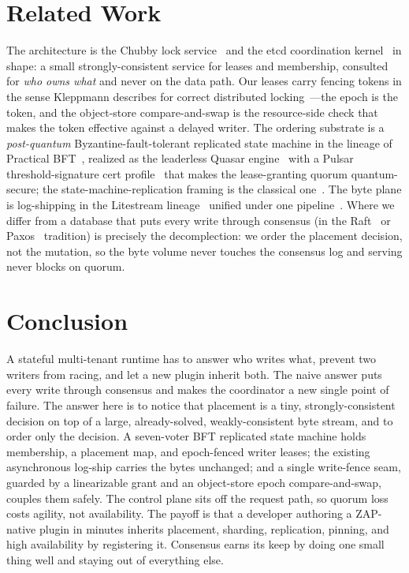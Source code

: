 \documentclass[11pt]{article}
\begin{document}
\section{Related Work}
\label{sec:related}

The architecture is the Chubby lock service~\cite{chubby} and the etcd
coordination kernel~\cite{etcdraft} in shape: a small strongly-consistent
service for leases and membership, consulted for \emph{who owns what} and
never on the data path. Our leases carry fencing tokens in the sense
Kleppmann describes for correct distributed locking~\cite{fencing}---the epoch
is the token, and the object-store compare-and-swap is the resource-side check
that makes the token effective against a delayed writer. The ordering
substrate is a \emph{post-quantum} Byzantine-fault-tolerant replicated
state machine in the lineage of Practical BFT~\cite{pbft}, realized as the
leaderless Quasar engine~\cite{avalanche,luxconsensus} with a Pulsar
threshold-signature cert profile~\cite{pulsar} that makes the lease-granting
quorum quantum-secure; the state-machine-replication framing is the classical
one~\cite{smr}. The byte
plane is log-shipping in the Litestream lineage~\cite{litestream} unified
under one pipeline~\cite{hip0107}. Where we differ from a database that puts
every write through consensus (in the Raft~\cite{raft} or Paxos~\cite{paxos}
tradition) is precisely the decomplection: we order the placement decision,
not the mutation, so the byte volume never touches the consensus log and
serving never blocks on quorum.

\section{Conclusion}
\label{sec:conclusion}

A stateful multi-tenant runtime has to answer who writes what, prevent two
writers from racing, and let a new plugin inherit both. The naive answer puts
every write through consensus and makes the coordinator a new single point of
failure. The answer here is to notice that placement is a tiny,
strongly-consistent decision on top of a large, already-solved,
weakly-consistent byte stream, and to order only the decision. A seven-voter
BFT replicated state machine holds membership, a placement map, and
epoch-fenced writer leases; the existing asynchronous log-ship carries the
bytes unchanged; and a single write-fence seam, guarded by a linearizable
grant and an object-store epoch compare-and-swap, couples them safely. The
control plane sits off the request path, so quorum loss costs agility, not
availability. The payoff is that a developer authoring a ZAP-native plugin in
minutes inherits placement, sharding, replication, pinning, and high
availability by registering it. Consensus earns its keep by doing one small
thing well and staying out of everything else.

{\small


}
\end{document}
